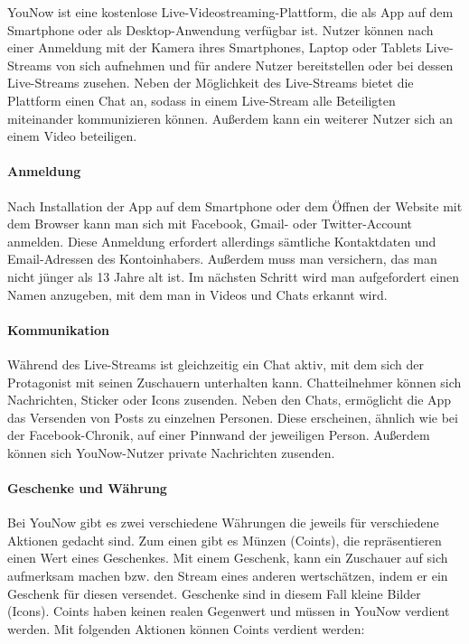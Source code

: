 YouNow ist eine kostenlose Live-Videostreaming-Plattform, die als App auf dem Smartphone oder als Desktop-Anwendung verfügbar ist. Nutzer können nach einer Anmeldung mit der Kamera ihres Smartphones, Laptop oder Tablets Live-Streams von sich aufnehmen und für andere Nutzer bereitstellen oder bei dessen Live-Streams zusehen. Neben der Möglichkeit des Live-Streams bietet die Plattform einen Chat an, sodass in einem Live-Stream alle Beteiligten miteinander kommunizieren können. Außerdem kann ein weiterer Nutzer sich an einem Video beteiligen. 

\paragraph{Anmeldung}
Nach Installation der App auf dem Smartphone oder dem Öffnen der Website mit dem Browser kann man sich mit Facebook, Gmail- oder Twitter-Account anmelden. Diese Anmeldung erfordert allerdings sämtliche Kontaktdaten und Email-Adressen des Kontoinhabers. Außerdem muss man versichern, das man nicht jünger als 13 Jahre alt ist.
Im nächsten Schritt wird man aufgefordert einen Namen anzugeben, mit dem man in Videos und Chats erkannt wird.

\paragraph{Kommunikation}
Während des Live-Streams ist gleichzeitig ein Chat aktiv, mit dem sich der Protagonist mit seinen Zuschauern unterhalten kann. Chatteilnehmer können sich Nachrichten, Sticker oder Icons zusenden. Neben den Chats, ermöglicht die App das Versenden von Posts zu einzelnen Personen. Diese erscheinen, ähnlich wie bei der Facebook-Chronik, auf einer Pinnwand der jeweiligen Person. Außerdem können sich YouNow-Nutzer private Nachrichten zusenden.


\paragraph{Geschenke und Währung}
Bei YouNow gibt es zwei verschiedene Währungen die jeweils für verschiedene Aktionen gedacht sind. Zum einen gibt es Münzen (Coints), die repräsentieren einen Wert eines Geschenkes. Mit einem Geschenk, kann ein Zuschauer auf sich aufmerksam machen bzw. den Stream eines anderen wertschätzen, indem er ein Geschenk für diesen versendet. Geschenke sind in diesem Fall kleine Bilder (Icons).
Coints haben keinen realen Gegenwert und müssen in YouNow verdient werden. Mit folgenden Aktionen können Coints verdient werden:

